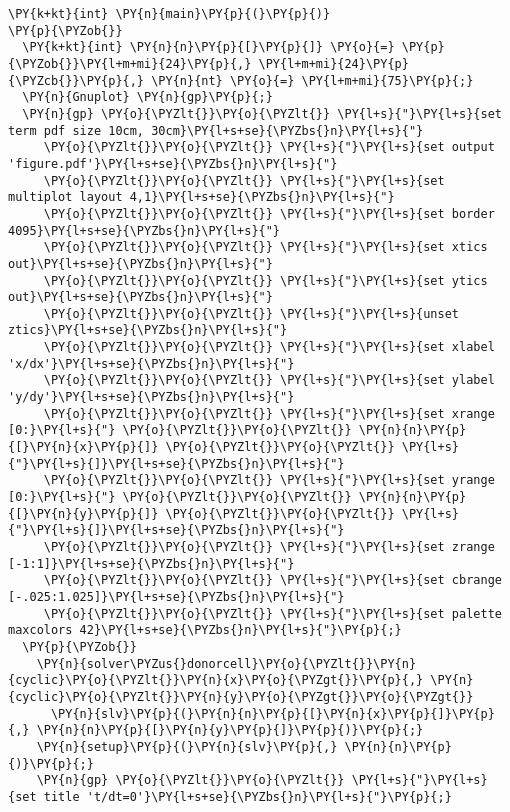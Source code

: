 \begin{Verbatim}[commandchars=\\\{\}]
\PY{k+kt}{int} \PY{n}{main}\PY{p}{(}\PY{p}{)} 
\PY{p}{\PYZob{}}
  \PY{k+kt}{int} \PY{n}{n}\PY{p}{[}\PY{p}{]} \PY{o}{=} \PY{p}{\PYZob{}}\PY{l+m+mi}{24}\PY{p}{,} \PY{l+m+mi}{24}\PY{p}{\PYZcb{}}\PY{p}{,} \PY{n}{nt} \PY{o}{=} \PY{l+m+mi}{75}\PY{p}{;}
  \PY{n}{Gnuplot} \PY{n}{gp}\PY{p}{;}
  \PY{n}{gp} \PY{o}{\PYZlt{}}\PY{o}{\PYZlt{}} \PY{l+s}{"}\PY{l+s}{set term pdf size 10cm, 30cm}\PY{l+s+se}{\PYZbs{}n}\PY{l+s}{"} 
     \PY{o}{\PYZlt{}}\PY{o}{\PYZlt{}} \PY{l+s}{"}\PY{l+s}{set output 'figure.pdf'}\PY{l+s+se}{\PYZbs{}n}\PY{l+s}{"}     
     \PY{o}{\PYZlt{}}\PY{o}{\PYZlt{}} \PY{l+s}{"}\PY{l+s}{set multiplot layout 4,1}\PY{l+s+se}{\PYZbs{}n}\PY{l+s}{"} 
     \PY{o}{\PYZlt{}}\PY{o}{\PYZlt{}} \PY{l+s}{"}\PY{l+s}{set border 4095}\PY{l+s+se}{\PYZbs{}n}\PY{l+s}{"}
     \PY{o}{\PYZlt{}}\PY{o}{\PYZlt{}} \PY{l+s}{"}\PY{l+s}{set xtics out}\PY{l+s+se}{\PYZbs{}n}\PY{l+s}{"}
     \PY{o}{\PYZlt{}}\PY{o}{\PYZlt{}} \PY{l+s}{"}\PY{l+s}{set ytics out}\PY{l+s+se}{\PYZbs{}n}\PY{l+s}{"}
     \PY{o}{\PYZlt{}}\PY{o}{\PYZlt{}} \PY{l+s}{"}\PY{l+s}{unset ztics}\PY{l+s+se}{\PYZbs{}n}\PY{l+s}{"}    
     \PY{o}{\PYZlt{}}\PY{o}{\PYZlt{}} \PY{l+s}{"}\PY{l+s}{set xlabel 'x/dx'}\PY{l+s+se}{\PYZbs{}n}\PY{l+s}{"}
     \PY{o}{\PYZlt{}}\PY{o}{\PYZlt{}} \PY{l+s}{"}\PY{l+s}{set ylabel 'y/dy'}\PY{l+s+se}{\PYZbs{}n}\PY{l+s}{"}
     \PY{o}{\PYZlt{}}\PY{o}{\PYZlt{}} \PY{l+s}{"}\PY{l+s}{set xrange [0:}\PY{l+s}{"} \PY{o}{\PYZlt{}}\PY{o}{\PYZlt{}} \PY{n}{n}\PY{p}{[}\PY{n}{x}\PY{p}{]} \PY{o}{\PYZlt{}}\PY{o}{\PYZlt{}} \PY{l+s}{"}\PY{l+s}{]}\PY{l+s+se}{\PYZbs{}n}\PY{l+s}{"}   
     \PY{o}{\PYZlt{}}\PY{o}{\PYZlt{}} \PY{l+s}{"}\PY{l+s}{set yrange [0:}\PY{l+s}{"} \PY{o}{\PYZlt{}}\PY{o}{\PYZlt{}} \PY{n}{n}\PY{p}{[}\PY{n}{y}\PY{p}{]} \PY{o}{\PYZlt{}}\PY{o}{\PYZlt{}} \PY{l+s}{"}\PY{l+s}{]}\PY{l+s+se}{\PYZbs{}n}\PY{l+s}{"}   
     \PY{o}{\PYZlt{}}\PY{o}{\PYZlt{}} \PY{l+s}{"}\PY{l+s}{set zrange [-1:1]}\PY{l+s+se}{\PYZbs{}n}\PY{l+s}{"}   
     \PY{o}{\PYZlt{}}\PY{o}{\PYZlt{}} \PY{l+s}{"}\PY{l+s}{set cbrange [-.025:1.025]}\PY{l+s+se}{\PYZbs{}n}\PY{l+s}{"}     
     \PY{o}{\PYZlt{}}\PY{o}{\PYZlt{}} \PY{l+s}{"}\PY{l+s}{set palette maxcolors 42}\PY{l+s+se}{\PYZbs{}n}\PY{l+s}{"}\PY{p}{;}
  \PY{p}{\PYZob{}}
    \PY{n}{solver\PYZus{}donorcell}\PY{o}{\PYZlt{}}\PY{n}{cyclic}\PY{o}{\PYZlt{}}\PY{n}{x}\PY{o}{\PYZgt{}}\PY{p}{,} \PY{n}{cyclic}\PY{o}{\PYZlt{}}\PY{n}{y}\PY{o}{\PYZgt{}}\PY{o}{\PYZgt{}} 
      \PY{n}{slv}\PY{p}{(}\PY{n}{n}\PY{p}{[}\PY{n}{x}\PY{p}{]}\PY{p}{,} \PY{n}{n}\PY{p}{[}\PY{n}{y}\PY{p}{]}\PY{p}{)}\PY{p}{;}
    \PY{n}{setup}\PY{p}{(}\PY{n}{slv}\PY{p}{,} \PY{n}{n}\PY{p}{)}\PY{p}{;}
    \PY{n}{gp} \PY{o}{\PYZlt{}}\PY{o}{\PYZlt{}} \PY{l+s}{"}\PY{l+s}{set title 't/dt=0'}\PY{l+s+se}{\PYZbs{}n}\PY{l+s}{"}\PY{p}{;}

\end{Verbatim}
